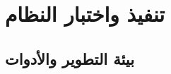 \chapter{تنفيذ واختبار النظام}
\label{ch:implementation}

\section{بيئة التطوير والأدوات}
\label{sec:dev-env}
~

